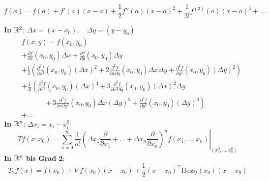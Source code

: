 \[
    f(x) = f(a) + f'(a)(x-a) + \frac{1}{2} f''(a)(x-a)^2 + \frac{1}{3!} f^{(3)}(a)(x-a)^3 + ...
\]

\textbf{In $\mathbb{R}^2$}: $\Delta x = (x - x_0)$, ~ $\Delta y = (y - y_0)$
\begin{align*}
    \; & f(x, y) =f(x_0, y_0)\\ &+ \frac{\partial f}{\partial x}(x_0,y_0) \Delta x + \frac{\partial f}{\partial y}(x_0,y_0) \Delta y\\
    &+ \frac{1}{2} \left(\frac{\partial^2 f}{\partial x^2}(x_0,y_0) (\Delta x)^2 + 2\frac{\partial^2 f}{\partial x \partial y}(x_0,y_0) \Delta x \Delta y + \frac{\partial^2 f}{\partial y^2}(x_0,y_0) (\Delta y)^2\right)\\
    &+ \frac{1}{3!} \left(\frac{\partial^3 f}{\partial x^3}(x_0,y_0) (\Delta x)^3 + 3\frac{\partial^3 f}{\partial x^2 \partial y}(x_0,y_0) (\Delta x)^2 \Delta y\right.\\
    &\quad\quad\quad\;+ \left.3\frac{\partial^3 f}{\partial x \partial y^2}(x_0,y_0) \Delta x (\Delta y)^2 + \frac{\partial^3 f}{\partial y^3}(x_0,y_0) (\Delta y)^3\right)\\
    & + ...
\end{align*}
\textbf{In $\mathbb{R}^n$}: $\Delta x_i = x_i - x_i^0$
\[
	Tf(x;x_0) = \left.\sum_{n=0}^\infty \frac{1}{n!}\left(\Delta x_1 \frac{\partial}{\partial x_1} + ... + \Delta x_n \frac{\partial}{\partial x_n} \right)^n 
		f(x_1, ..., x_n)\right|_{(x_1^0,...,x_n^0)}
\]
\textbf{In $\mathbb{R}^n$ bis Grad 2}:
\[
    T_2f(x) = f(x_0) + \nabla f(x_0)	 (x-x_0) + \frac{1}{2} (x-x_0)^\top \text{Hess}_f(x_0) (x-x_0) 
\]
